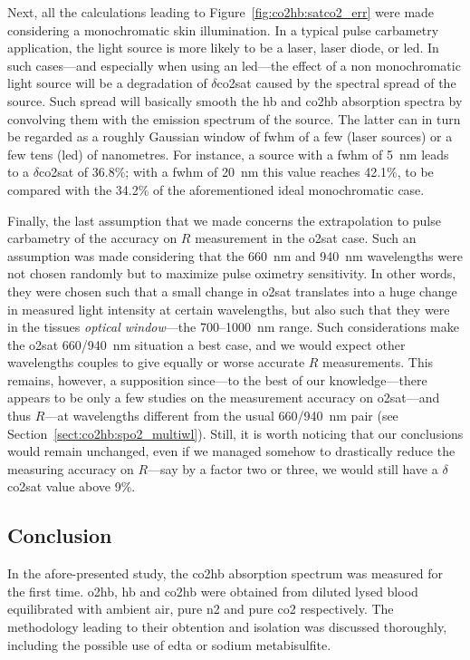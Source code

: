 Next, all the calculations leading to Figure~\ref{fig:co2hb:satco2_err} were made considering a monochromatic skin illumination. In a typical pulse carbametry application, the light source is more likely to be a laser, laser diode, or \gls{led}. In such cases---and especially when using an \gls{led}---the effect of a non monochromatic light source will be a degradation of $\delta$\gls{co2sat} caused by the spectral spread of the source. Such spread will basically smooth the \gls{hb} and \gls{co2hb} absorption spectra by convolving them with the emission spectrum of the source. The latter can in turn be regarded as a roughly Gaussian window of \gls{fwhm} of a few (laser sources) or a few tens (\gls{led}) of nanometres. For instance, a source with a \gls{fwhm} of 5~nm leads to a $\delta$\gls{co2sat} of 36.8\%; with a \gls{fwhm} of 20~nm this value reaches 42.1\%, to be compared with the 34.2\% of the aforementioned ideal monochromatic case.

Finally, the last assumption that we made concerns the extrapolation to pulse carbametry of the accuracy on $R$ measurement in the \gls{o2sat} case. Such an assumption was made considering that the 660~nm and 940~nm wavelengths were not chosen randomly but to maximize pulse oximetry sensitivity. In other words, they were chosen such that a small change in \gls{o2sat} translates into a huge change in measured light intensity at certain wavelengths\cite{mook1969, assendelft1970}, but also such that they were in the tissues \emph{optical window}---the 700--1000~nm range\cite{wilson1985, melo2001, ash2017}. Such considerations make the \gls{o2sat} 660/940~nm situation a best case, and we would expect other wavelengths couples to give equally or worse accurate $R$ measurements. This remains, however, a supposition since---to the best of our knowledge---there appears to be only a few studies on the measurement accuracy on \gls{o2sat}---and thus $R$---at wavelengths different from the usual 660/940~nm pair (see Section~\ref{sect:co2hb:spo2_multiwl}). Still, it is worth noticing that our conclusions would remain unchanged, even if we managed somehow to drastically reduce the measuring accuracy on $R$---say by a factor two or three, we would still have a $\delta$\gls{co2sat} value above 9\%.

\subsection{Conclusion}

In the afore-presented study, the \gls{co2hb} absorption spectrum was measured for the first time. \gls{o2hb}, \gls{hb} and \gls{co2hb} were obtained from diluted lysed blood equilibrated with ambient air, pure \gls{n2} and pure \gls{co2} respectively. The methodology leading to their obtention and isolation was discussed thoroughly, including the possible use of \gls{edta} or sodium metabisulfite.


